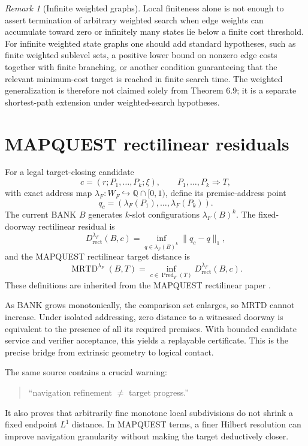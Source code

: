 \documentclass[11pt]{article}
\theoremstyle{definition}
\theoremstyle{remark}
\newtheorem{remark}[theorem]{Remark}
\newcommand{\MRTD}{\operatorname{MRTD}}
\newcommand{\Pred}{\operatorname{Pred}}
\begin{document}
\begin{remark}[Infinite weighted graphs]
Local finiteness alone is not enough to assert termination of arbitrary weighted search when edge weights can accumulate toward zero or infinitely many states lie below a finite cost threshold. For infinite weighted state graphs one should add standard hypotheses, such as finite weighted sublevel sets, a positive lower bound on nonzero edge costs together with finite branching, or another condition guaranteeing that the relevant minimum-cost target is reached in finite search time. The weighted generalization is therefore not claimed solely from Theorem 6.9; it is a separate shortest-path extension under weighted-search hypotheses.
\end{remark}

\section{MAPQUEST rectilinear residuals}

For a legal target-closing candidate
\[
c=(r;P_1,\dots,P_k;\xi),\qquad P_1,\dots,P_k\Longrightarrow T,
\]
with exact address map $\lambda_F:W_F\hookrightarrow\mathbb Q\cap[0,1)$, define its premise-address point
\[
q_c=(\lambda_F(P_1),\dots,\lambda_F(P_k)).
\]
The current BANK $B$ generates $k$-slot configurations $\lambda_F(B)^k$. The fixed-doorway rectilinear residual is
\[
D^{\lambda_F}_{\mathrm{rect}}(B,c)
=
\inf_{q\in\lambda_F(B)^k}\|q_c-q\|_1,
\]
and the MAPQUEST rectilinear target distance is
\[
\MRTD^{\lambda_F}(B,T)
=
\inf_{c\in\Pred_F(T)}D^{\lambda_F}_{\mathrm{rect}}(B,c).
\]
These definitions are inherited from the MAPQUEST rectilinear paper \cite{MRTD}.

As BANK grows monotonically, the comparison set enlarges, so MRTD cannot increase. Under isolated addressing, zero distance to a witnessed doorway is equivalent to the presence of all its required premises. With bounded candidate service and verifier acceptance, this yields a replayable certificate. This is the precise bridge from extrinsic geometry to logical contact.

The same source contains a crucial warning:
\begin{quote}
``navigation refinement $\neq$ target progress.'' \cite{MRTD}
\end{quote}
It also proves that arbitrarily fine monotone local subdivisions do not shrink a fixed endpoint $L^1$ distance. In MAPQUEST terms, a finer Hilbert resolution can improve navigation granularity without making the target deductively closer.
\end{document}
